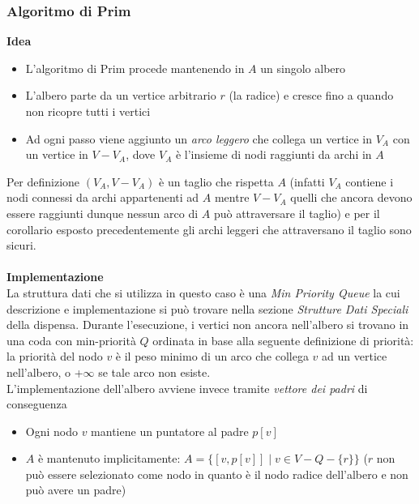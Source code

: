 \documentclass[../cheatSheetAlgoritmi.tex]{subfiles}
\begin{document}
\subsubsection{Algoritmo di Prim}
\textbf{Idea}
\begin{itemize}
	\item L'algoritmo di Prim procede mantenendo in $A$ un singolo albero
	\item L'albero parte da un vertice arbitrario $r$ (la radice) e cresce fino a quando non ricopre tutti i vertici
	\item Ad ogni passo viene aggiunto un \emph{arco leggero} che collega un vertice in $V_{A}$ con un vertice in $V - V_{A}$, dove $V_{A}$ è l'insieme di nodi raggiunti da archi in $A$
\end{itemize}
Per definizione $(V_{A}, V - V_{A})$ è un taglio che rispetta $A$ (infatti $V_{A}$ contiene i nodi connessi da archi appartenenti ad $A$ mentre $V-V_{A}$ quelli che ancora devono essere raggiunti dunque nessun arco di $A$ può attraversare il taglio) e per il corollario esposto precedentemente gli archi leggeri che attraversano il taglio sono sicuri.\\\\
\textbf{Implementazione}\\
La struttura dati che si utilizza in questo caso è una \emph{Min Priority Queue} la cui descrizione e implementazione si può trovare nella sezione \emph{Strutture Dati Speciali} della dispensa. Durante l'esecuzione, i vertici non ancora nell'albero si trovano in una coda con min-priorità $Q$ ordinata in base alla seguente definizione di priorità: la priorità del nodo $v$ è il peso minimo di un arco che collega $v$ ad un vertice nell'albero, o +$\infty$ se tale arco non esiste.\\
L'implementazione dell'albero avviene invece tramite \emph{vettore dei padri} di conseguenza
\begin{itemize}
	\item Ogni nodo $v$ mantiene un puntatore al padre $p[v]$
	\item $A$ è mantenuto implicitamente: $A = \{[v, p[v]] \mid v \in V - Q - \{r\}\}$ ($r$ non può essere selezionato come nodo in quanto è il nodo radice dell'albero e non può avere un padre)
\end{itemize}
\end{document}
